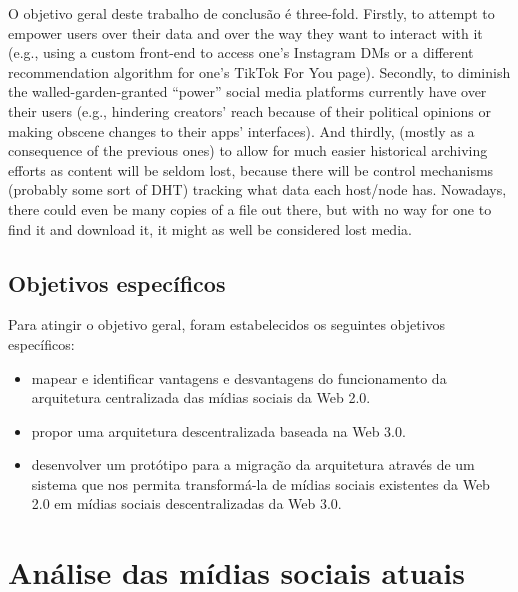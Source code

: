 O objetivo geral deste trabalho de conclusão é three-fold.
Firstly, to attempt to empower users over their data and over the way they want to interact with it (e.g., using a custom front-end to access one's Instagram DMs or a different recommendation algorithm for one's TikTok For You page).
Secondly, to diminish the walled-garden-granted ``power'' social media platforms currently have over their users (e.g., hindering creators' reach because of their political opinions or making obscene changes to their apps' interfaces).
And thirdly, (mostly as a consequence of the previous ones) to allow for much easier historical archiving efforts as content will be seldom lost, because there will be control mechanisms (probably some sort of DHT) tracking what data each host/node has.
Nowadays, there could even be many copies of a file out there, but with no way for one to find it and download it, it might as well be considered lost media\footnotemark.


\section{Objetivos específicos}

Para atingir o objetivo geral, foram estabelecidos os seguintes objetivos específicos:

\begin{itemize}
    \item mapear e identificar vantagens e desvantagens do funcionamento da arquitetura centralizada das mídias sociais da Web 2.0.
    \item propor uma arquitetura descentralizada baseada na Web 3.0.
    \item desenvolver um protótipo para a migração da arquitetura através de um sistema que nos permita transformá-la de mídias sociais existentes da Web 2.0 em mídias sociais descentralizadas da Web 3.0.
\end{itemize}

\chapter{Análise das mídias sociais atuais}

